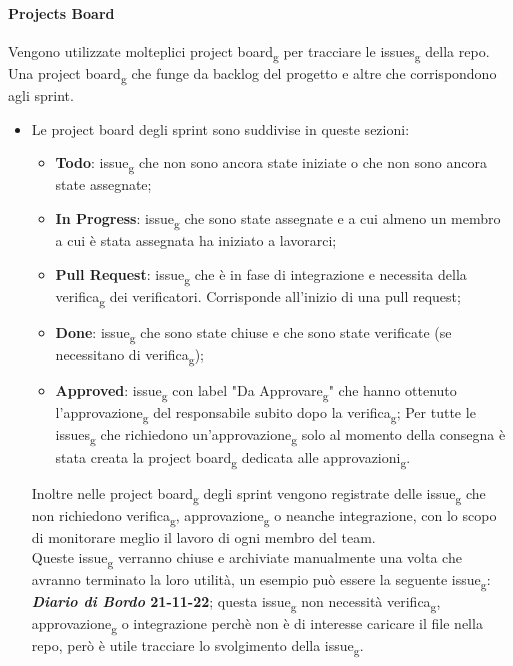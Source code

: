 \paragraph{Projects Board}
Vengono utilizzate molteplici project board\textsubscript{g} per tracciare le issues\textsubscript{g} della repo.
Una project board\textsubscript{g} che funge da backlog del progetto e altre che corrispondono agli sprint.

\begin{itemize}
	\item Le project board degli sprint sono suddivise in queste sezioni:
	\begin{itemize}
		\item \textbf{Todo}: issue\textsubscript{g} che non sono ancora state iniziate o che non sono ancora state assegnate;
		\item \textbf{In Progress}: issue\textsubscript{g} che sono state assegnate e a cui almeno un membro a cui è stata assegnata ha iniziato a lavorarci;
		\item \textbf{Pull Request}: issue\textsubscript{g} che è in fase di integrazione e necessita della verifica\textsubscript{g} dei verificatori. Corrisponde all'inizio di una pull request;
		\item \textbf{Done}: issue\textsubscript{g} che sono state chiuse e che sono state verificate (se necessitano di verifica\textsubscript{g});
		\item \textbf{Approved}: issue\textsubscript{g} con label "Da Approvare\textsubscript{g}" che hanno ottenuto l'approvazione\textsubscript{g} del responsabile subito dopo la verifica\textsubscript{g};
		Per tutte le issues\textsubscript{g} che richiedono un'approvazione\textsubscript{g} solo al momento della consegna è stata creata la project board\textsubscript{g} dedicata alle approvazioni\textsubscript{g}.
	\end{itemize}
	Inoltre nelle project board\textsubscript{g} degli sprint vengono registrate delle issue\textsubscript{g} che non richiedono verifica\textsubscript{g}, approvazione\textsubscript{g} o neanche integrazione, con lo scopo di monitorare meglio il lavoro di ogni membro del team.\\
Queste issue\textsubscript{g} verranno chiuse e archiviate manualmente una volta che avranno terminato la loro utilità, un esempio può essere la seguente issue\textsubscript{g}:\\
\textbf{\textit{Diario di Bordo} 21-11-22}; questa issue\textsubscript{g} non necessità verifica\textsubscript{g}, approvazione\textsubscript{g} o integrazione perchè non è di interesse caricare il file nella repo, però è utile tracciare lo svolgimento della issue\textsubscript{g}.

\end{itemize}
